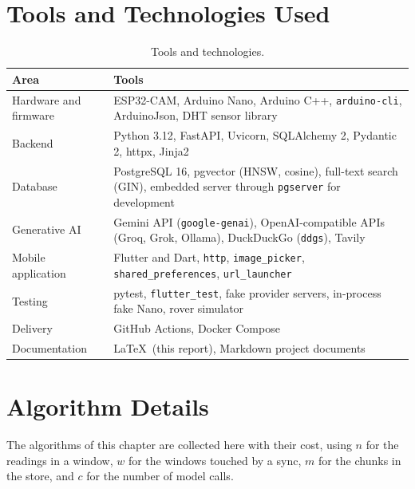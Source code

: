 \section{Tools and Technologies Used}

\begin{table}[H]
\centering
\caption{Tools and technologies.}
\label{tab:tools}
\small
\begin{tabular}{|P{3.4cm}|P{9.4cm}|}
\hline
\textbf{Area} & \textbf{Tools}\\\hline
Hardware and firmware & ESP32-CAM, Arduino Nano, Arduino C++, \texttt{arduino-cli}, ArduinoJson, DHT sensor library\\\hline
Backend & Python 3.12, FastAPI, Uvicorn, SQLAlchemy 2, Pydantic 2, httpx, Jinja2\\\hline
Database & PostgreSQL 16, pgvector (HNSW, cosine), full-text search (GIN), embedded server through \texttt{pgserver} for development\\\hline
Generative AI & Gemini API (\texttt{google-genai}), OpenAI-compatible APIs (Groq, Grok, Ollama), DuckDuckGo (\texttt{ddgs}), Tavily\\\hline
Mobile application & Flutter and Dart, \texttt{http}, \texttt{image\_picker}, \texttt{shared\_preferences}, \texttt{url\_launcher}\\\hline
Testing & pytest, \texttt{flutter\_test}, fake provider servers, in-process fake Nano, rover simulator\\\hline
Delivery & GitHub Actions, Docker Compose\\\hline
Documentation & \LaTeX\ (this report), Markdown project documents\\\hline
\end{tabular}
\end{table}

\section{Algorithm Details}

The algorithms of this chapter are collected here with their cost, using $n$ for the readings in a window, $w$ for the windows touched by a
sync, $m$ for the chunks in the store, and $c$ for the number of model calls.

